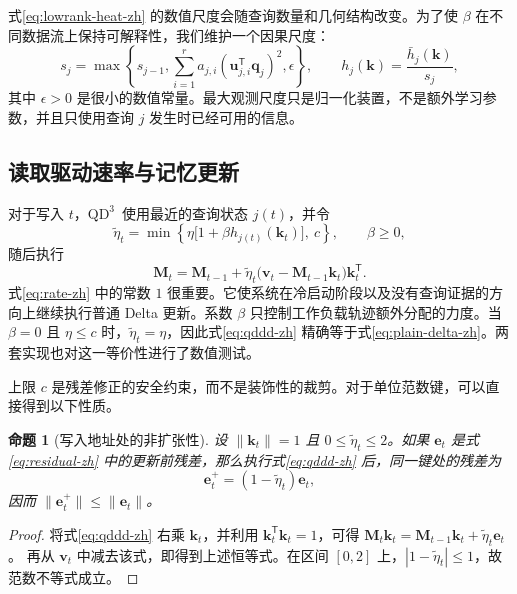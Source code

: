 \documentclass[11pt,a4paper]{ctexart}
\newtheorem{proposition}{命题}
\newcommand{\M}{\bm{M}}
\newcommand{\kvec}{\bm{k}}
\newcommand{\qvec}{\bm{q}}
\newcommand{\vvec}{\bm{v}}
\newcommand{\evec}{\bm{e}}
\newcommand{\norm}[1]{\lVert#1\rVert}
\newcommand{\QDDD}{\ensuremath{\mathrm{QD}^{3}}}
\begin{document}
式\eqref{eq:lowrank-heat-zh} 的数值尺度会随查询数量和几何结构改变。为了使 $\beta$ 在不同数据流上保持可解释性，我们维护一个因果尺度：
\begin{equation}
 s_j=\max\!\left\{s_{j-1},
 \sum_{i=1}^{r}a_{j,i}(\bm u_{j,i}^{\mathsf T}\qvec_j)^2,\epsilon\right\},
 \qquad
 h_j(\kvec)=\frac{\bar h_j(\kvec)}{s_j},
 \label{eq:normalization-zh}
\end{equation}
其中 $\epsilon>0$ 是很小的数值常量。最大观测尺度只是归一化装置，不是额外学习参数，并且只使用查询 $j$ 发生时已经可用的信息。

\subsection{读取驱动速率与记忆更新}

对于写入 $t$，\QDDD\ 使用最近的查询状态 $j(t)$，并令
\begin{equation}
 \widetilde\eta_t=\min\left\{
 \eta\bigl[1+\beta h_{j(t)}(\kvec_t)\bigr],\ c\right\},
 \qquad \beta\geq0,
 \label{eq:rate-zh}
\end{equation}
随后执行
\begin{equation}
 \M_t=\M_{t-1}+\widetilde\eta_t
 \bigl(\vvec_t-\M_{t-1}\kvec_t\bigr)\kvec_t^{\mathsf T}.
 \label{eq:qddd-zh}
\end{equation}
式\eqref{eq:rate-zh} 中的常数 $1$ 很重要。它使系统在冷启动阶段以及没有查询证据的方向上继续执行普通 Delta 更新。系数 $\beta$ 只控制工作负载轨迹额外分配的力度。当 $\beta=0$ 且 $\eta\leq c$ 时，$\widetilde\eta_t=\eta$，因此式\eqref{eq:qddd-zh} 精确等于式\eqref{eq:plain-delta-zh}。两套实现也对这一等价性进行了数值测试。

上限 $c$ 是残差修正的安全约束，而不是装饰性的裁剪。对于单位范数键，可以直接得到以下性质。

\begin{proposition}[写入地址处的非扩张性]\label{prop:stable-zh}
设 $\norm{\kvec_t}=1$ 且 $0\leq\widetilde\eta_t\leq2$。如果 $\evec_t$ 是式\eqref{eq:residual-zh} 中的更新前残差，那么执行式\eqref{eq:qddd-zh} 后，同一键处的残差为
\begin{equation}
 \evec_t^{+}=(1-\widetilde\eta_t)\evec_t,
\end{equation}
因而 $\norm{\evec_t^{+}}\leq\norm{\evec_t}$。
\end{proposition}

\begin{proof}
将式\eqref{eq:qddd-zh} 右乘 $\kvec_t$，并利用 $\kvec_t^{\mathsf T}\kvec_t=1$，可得
$\M_t\kvec_t=\M_{t-1}\kvec_t+\widetilde\eta_t\evec_t$。
再从 $\vvec_t$ 中减去该式，即得到上述恒等式。在区间 $[0,2]$ 上，$|1-\widetilde\eta_t|\leq1$，故范数不等式成立。
\end{proof}
\end{document}
